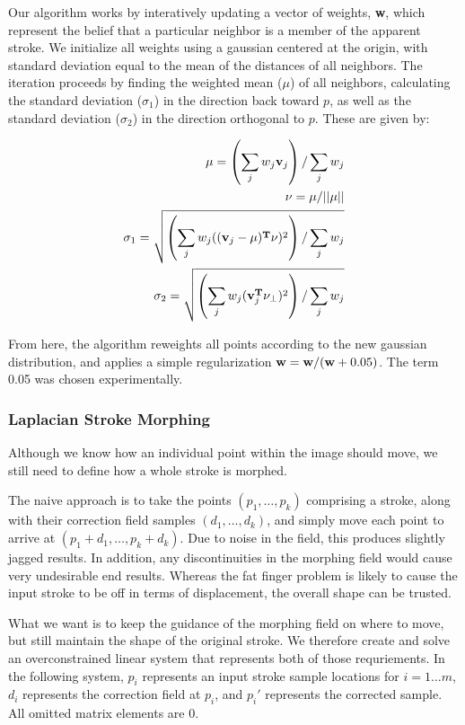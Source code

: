 Our algorithm works by interatively updating a vector of weights, {\bf w}, which represent the belief that a particular neighbor is a member of the apparent stroke.  We initialize all weights using a gaussian centered at the origin, with standard deviation equal to the mean of the distances of all neighbors. The iteration proceeds by finding the weighted mean ($\mu$) of all neighbors, calculating the standard deviation ($\sigma_1$) in the direction back toward $p$, as well as the standard deviation ($\sigma_2$) in the direction orthogonal to $p$.  These are given by:

\begin{eqnarray}
{\bf \mu} = \left(\sum_j w_j {\bf v}_j\right) / \sum_j w_j \\
{\bf \nu} = \mu/||\mu|| \\
\sigma_1 =  \sqrt{\left(\sum_j w_j (({\bf v}_j-\mu)^{\bf T}\nu)^2\right) / \sum_j w_j} \\
\sigma_2 =  \sqrt{\left(\sum_j w_j ({\bf v}_j^{\bf T}\nu_\perp)^2\right) / \sum_j w_j}
\end{eqnarray}

From here, the algorithm reweights all points according to the new gaussian distribution, and applies a simple regularization ${\bf w} = {\bf w}/ ({\bf w}+0.05)$.  The term 0.05 was chosen experimentally.

\subsubsection{Laplacian Stroke Morphing}

Although we know how an individual point within the image should move, we still need to define how a whole stroke is morphed.   

The naive approach is to take the points $(p_1, \ldots, p_k)$ comprising a stroke, along with their correction field samples $(d_1, \ldots, d_k)$, and simply move each point to arrive at $(p_1 + d_1, \ldots, p_k + d_k)$.  Due to noise in the field, this produces slightly jagged results.  In addition, any discontinuities in the morphing field would cause very undesirable end results.   Whereas the fat finger problem is likely to cause the input stroke to be off in terms of displacement, the overall shape can be trusted.

What we want is to keep the guidance of the morphing field on where to move, but still maintain the shape of the original stroke.  We therefore create and solve an overconstrained linear system that represents both of those requriements.  In the following system, $p_i$ represents an input stroke sample locations for $i=1\ldots m$, $d_i$ represents the correction field at $p_i$, and $p_i'$ represents the corrected sample.  All omitted matrix elements are 0.

